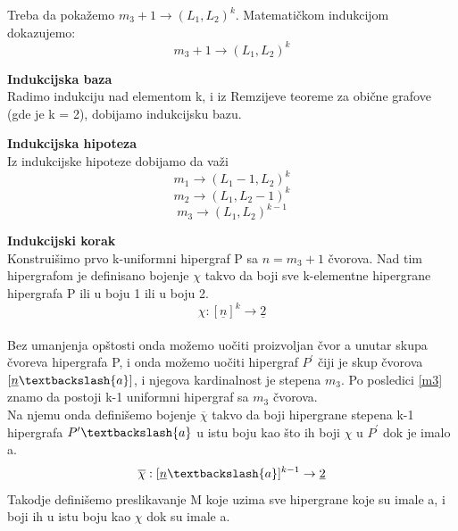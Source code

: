 \documentclass[a4paper]{article}
\begin{document}
	\noindent Treba da pokažemo $m_{3} + 1 \rightarrow (L_1, L_2)^k$. 
	Matematičkom indukcijom dokazujemo:
	\begin{equation}\label{OsnovnaRemzijeva}
		m_{3} + 1 \rightarrow (L_1, L_2)^k		
	\end{equation}
	\begin{description}
		\item \textbf{Indukcijska baza} \\
		Radimo indukciju nad elementom k, i iz Remzijeve teoreme za obične grafove (gde je k = 2), dobijamo indukcijsku bazu. 
		\item \textbf{Indukcijska hipoteza}\\
		Iz indukcijske hipoteze dobijamo da važi
		\begin{equation}\label{m1}
		m_{1} \rightarrow (L_1 - 1, L_2)^k		
		\end{equation}
		\begin{equation}\label{m2}
		m_{2} \rightarrow (L_1, L_2 -1)^k		
		\end{equation}
		\begin{equation}\label{m3}
		m_{3} \rightarrow (L_1, L_2)^{k-1}		
		\end{equation}
		\item \textbf{Indukcijski korak}\\	
		Konstruišimo prvo k-uniformni hipergraf P sa $n = m_3 + 1$ čvorova. Nad tim hipergrafom je definisano bojenje $\chi$ takvo da boji sve k-elementne hipergrane hipergrafa P ili u boju 1 ili u boju 2.\begin{equation}
			\chi : [ \underline{n} ]^k  \rightarrow \underline{2}
		\end{equation} \\
		Bez umanjenja opštosti onda možemo uočiti proizvoljan čvor a unutar skupa čvoreva hipergrafa P, i onda možemo uočiti hipergraf $P^\prime$ čiji je skup čvorova $[\underline{n} \textbackslash \{ a \}]$, i njegova kardinalnost je stepena $m_3$. Po posledici \ref{m3} znamo da postoji k-1 uniformni hipergraf sa $m_3$ čvorova. %
		\\
		Na njemu onda definišemo bojenje $\overline{\chi}$ takvo da boji hipergrane stepena k-1 hipergrafa $P^\prime \textbackslash \{ a \}$ u istu boju kao što ih boji  $\chi$ u $P^\prime$ dok je imalo a.
		\begin{equation}
			\overline{\chi} : [ \underline{n} \textbackslash \{a\} ]^{k-1}  \rightarrow \underline{2}
		\end{equation} %
		Takodje definišemo preslikavanje M koje uzima sve hipergrane koje su imale a, i boji ih u istu boju kao $\chi$ dok su imale a.

\end{description}
\end{document}
